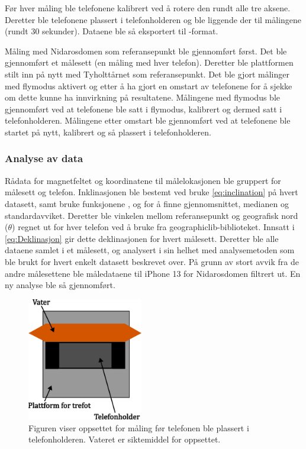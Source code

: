 Før hver måling ble telefonene kalibrert ved å rotere den rundt alle tre aksene. Deretter ble telefonene plassert i telefonholderen og ble liggende der til målingene (rundt $30$ sekunder). Dataene ble så eksportert til -format. 

Måling med Nidarosdomen som referansepunkt ble gjennomført først. Det ble gjennomført et målesett (en måling med hver telefon). Deretter ble plattformen stilt inn på nytt med Tyholttårnet som referansepunkt. Det ble gjort målinger med flymodus aktivert og etter å ha gjort en omstart av telefonene for å sjekke om dette kunne ha innvirkning på resultatene. Målingene med flymodus ble gjennomført ved at telefonene ble satt i flymodus, kalibrert og dermed satt i telefonholderen. Målingene etter omstart ble gjennomført ved at telefonene ble startet på nytt, kalibrert og så plassert i telefonholderen.

\subsubsection{Analyse av data}
Rådata for magnetfeltet og koordinatene til målelokasjonen ble gruppert for målesett og telefon.
Inklinasjonen ble bestemt ved bruke \eqref{eq:inclination} på hvert datasett, samt bruke funksjonene 
\href{https://numpy.org/doc/stable/reference/generated/numpy.mean.html#numpy.mean}{}, 
\href{https://numpy.org/doc/stable/reference/generated/numpy.median.html#numpy-median}{} og 
\href{https://docs.scipy.org/doc/scipy/reference/generated/scipy.stats.tstd.html#scipy.stats.tstd}
{} for å finne gjennomsnittet, medianen og 
standardavviket.
Deretter ble vinkelen mellom referansepunkt og geografisk nord ($\theta$) regnet ut for hver telefon ved å 
bruke  fra geographiclib-biblioteket.
Innsatt i \eqref{eq:Deklinasjon} gir dette deklinasjonen for hvert målesett.
Deretter ble alle dataene samlet i et målesett, og analysert i sin helhet med analysemetoden som ble brukt 
for hvert enkelt datasett beskrevet over.
På grunn av stort avvik fra de andre målesettene ble måledataene til iPhone 13 for Nidarosdomen filtrert ut. En ny analyse ble så gjennomført. 

 
\begin{figure}
    \centering
    \includegraphics[width=0.45\textwidth]{img/Plattform med vater.pdf}                 
    \caption{Figuren viser oppsettet for måling før telefonen ble plassert i telefonholderen. Vateret er siktemiddel for oppsettet.}
    \label{fig:med_vater}
\end{figure}

